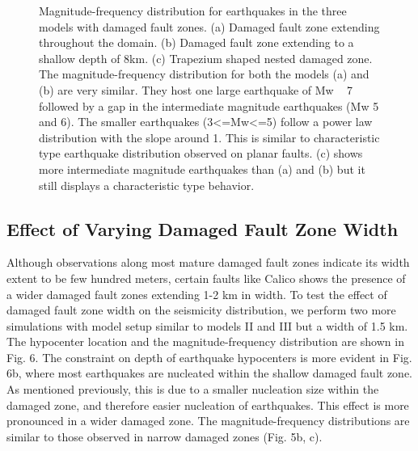 \documentclass[11pt]{article}
\newcommand{\nathan}[1]{{\color{brown}#1}}
\begin{document}
\begin{figure}[!htb]
{    }
    \caption{Magnitude-frequency distribution for earthquakes in the three models with damaged fault zones. (a) Damaged fault zone extending throughout the domain. (b) Damaged fault zone extending to a shallow depth of 8km. (c)  Trapezium shaped nested damaged zone. The magnitude-frequency distribution for both the models (a) and (b) are very similar. They host one large earthquake of Mw ~ 7 followed by a gap in the intermediate magnitude earthquakes (Mw 5 and 6). The smaller earthquakes (3<=Mw<=5) follow a power law distribution with the slope around 1. This is similar to characteristic type earthquake distribution observed on planar faults. (c) shows more intermediate magnitude earthquakes than (a) and (b) but it still displays a characteristic type behavior.}
\end{figure}

\subsection{Effect of Varying Damaged Fault Zone Width}
Although observations along most mature damaged fault zones indicate its width extent to be few hundred meters, certain faults like Calico \citep{cochran_2009} shows the presence of a wider damaged fault zones extending 1-2 km in width. To test the effect of damaged fault zone width on the seismicity distribution, we perform two more simulations with model setup similar to models II and III but a width of 1.5 km. The hypocenter location and the magnitude-frequency distribution are shown in Fig. 6. The constraint on depth of earthquake hypocenters is more evident in Fig. 6b, where most earthquakes are nucleated within the shallow damaged fault zone. As mentioned previously, this is due to a smaller nucleation size within the damaged zone, and therefore easier nucleation of earthquakes. This effect is more pronounced in a wider damaged zone. The magnitude-frequency distributions are similar to those observed in \nathan{narrow damaged zones (Fig. 5b, c)}.
\end{document}
